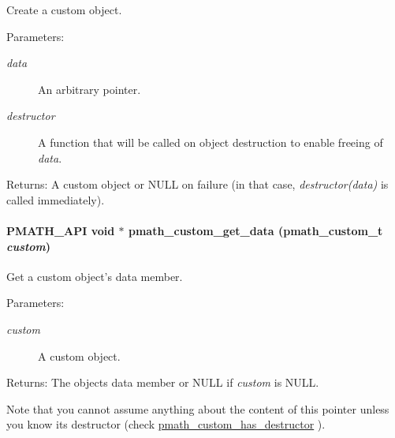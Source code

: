 Create a custom object. 

\begin{Desc}
\item[Parameters:]
\begin{description}
\item[{\em data}]An arbitrary pointer. \item[{\em destructor}]A function that will be called on object destruction to enable freeing of {\em data\/}. \end{description}
\end{Desc}
\begin{Desc}
\item[Returns:]A custom object or NULL on failure (in that case, {\em destructor(data)\/} is called immediately). \end{Desc}
\hypertarget{group__custom_ge7902883fc5e8f88b60410950564fdcd}{
\paragraph[{pmath\_\-custom\_\-get\_\-data}]{\setlength{\rightskip}{0pt plus 5cm}PMATH\_\-API void $\ast$ pmath\_\-custom\_\-get\_\-data ({\bf pmath\_\-custom\_\-t} {\em custom})}\hfill}
\label{group__custom_ge7902883fc5e8f88b60410950564fdcd}


Get a custom object's data member. 

\begin{Desc}
\item[Parameters:]
\begin{description}
\item[{\em custom}]A custom object. \end{description}
\end{Desc}
\begin{Desc}
\item[Returns:]The objects data member or NULL if {\em custom\/} is NULL.\end{Desc}
Note that you cannot assume anything about the content of this pointer unless you know its destructor (check \hyperlink{group__custom_g0847bc90fa81ddfdf0f3ff84d32947cf}{pmath\_\-custom\_\-has\_\-destructor} ).

